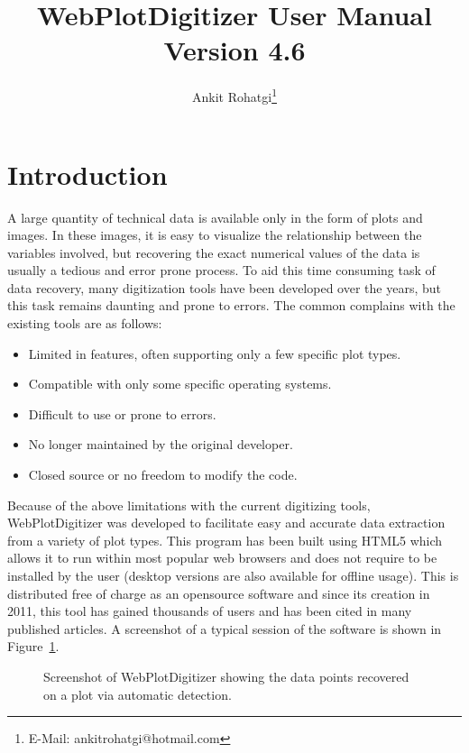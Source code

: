 \documentclass[letterpaper, 11pt]{article}
\begin{document}
\title{WebPlotDigitizer User Manual\\ Version 4.6}
\author{Ankit Rohatgi\footnote{E-Mail: ankitrohatgi@hotmail.com}}
\maketitle
\tableofcontents
\newpage

\section{Introduction}
A large quantity of technical data is available only in the form of plots and images. In these images, it is easy to visualize the relationship between the variables involved, but recovering the exact numerical values of the data is usually a tedious and error prone process. To aid this time consuming task of data recovery, many digitization tools have been developed over the years, but this task remains daunting and prone to errors. The common complains with the existing tools are as follows:

\begin{itemize}
\item{Limited in features, often supporting only a few specific plot types.}
\item{Compatible with only some specific operating systems.}
\item{Difficult to use or prone to errors.}
\item{No longer maintained by the original developer.}
\item{Closed source or no freedom to modify the code.}
\end{itemize}

Because of the above limitations with the current digitizing tools, WebPlotDigitizer was developed to facilitate easy and accurate data extraction from a variety of plot types. This program has been built using HTML5 which allows it to run within most popular web browsers and does not require to be installed by the user (desktop versions are also available for offline usage). This is distributed free of charge as an opensource software and since its creation in 2011, this tool has gained thousands of users and has been cited in many published articles. A screenshot of a typical session of the software is shown in Figure~\ref{fig:screenshot}.

\begin{figure}
\begin{center}
\caption{Screenshot of WebPlotDigitizer showing the data points recovered on a plot via automatic detection.}
\label{fig:screenshot}
\end{center}
\end{figure}
\end{document}
